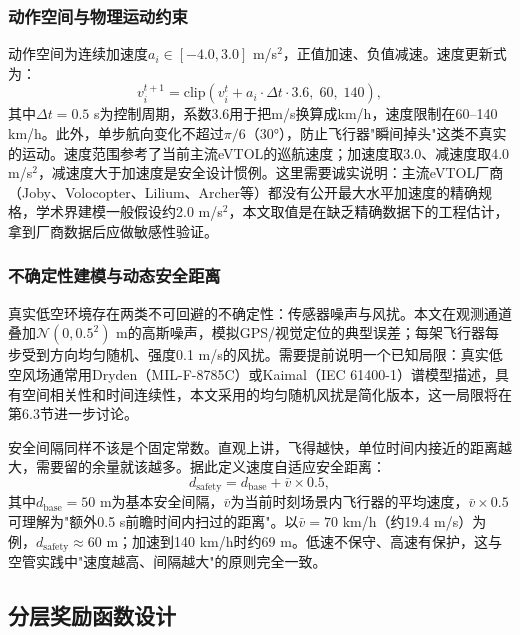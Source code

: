 \documentclass[12pt,a4paper,UTF8]{ctexart}
\begin{document}
\subsubsection{动作空间与物理运动约束}

动作空间为连续加速度$a_i\in[-4.0, 3.0]$ m/s$^2$，正值加速、负值减速。速度更新式为：
\begin{equation}
    v_i^{t+1} = \text{clip}\!\left(v_i^{t} + a_i \cdot \Delta t \cdot 3.6,\; 60,\; 140\right),
    \label{eq:velocity_update}
\end{equation}
其中$\Delta t=0.5$ s为控制周期，系数3.6用于把m/s换算成km/h，速度限制在60--140 km/h。此外，单步航向变化不超过$\pi/6$（30°），防止飞行器"瞬间掉头"这类不真实的运动。速度范围参考了当前主流eVTOL的巡航速度；加速度取3.0、减速度取4.0 m/s$^2$，减速度大于加速度是安全设计惯例。这里需要诚实说明：主流eVTOL厂商（Joby、Volocopter、Lilium、Archer等）都没有公开最大水平加速度的精确规格，学术界建模一般假设约2.0 m/s$^2$\cite{ref25}，本文取值是在缺乏精确数据下的工程估计，拿到厂商数据后应做敏感性验证。

\subsubsection{不确定性建模与动态安全距离}

真实低空环境存在两类不可回避的不确定性：传感器噪声与风扰。本文在观测通道叠加$\mathcal{N}(0, 0.5^2)$ m的高斯噪声，模拟GPS/视觉定位的典型误差；每架飞行器每步受到方向均匀随机、强度0.1 m/s的风扰。需要提前说明一个已知局限：真实低空风场通常用Dryden（MIL-F-8785C）\cite{ref26}或Kaimal（IEC 61400-1）\cite{ref44}谱模型描述，具有空间相关性和时间连续性，本文采用的均匀随机风扰是简化版本，这一局限将在第6.3节进一步讨论。

安全间隔同样不该是个固定常数。直观上讲，飞得越快，单位时间内接近的距离越大，需要留的余量就该越多。据此定义速度自适应安全距离：
\begin{equation}
    d_{\text{safety}} = d_{\text{base}} + \bar{v} \times 0.5,
    \label{eq:safety_distance}
\end{equation}
其中$d_{\text{base}}=50$ m为基本安全间隔，$\bar{v}$为当前时刻场景内飞行器的平均速度，$\bar{v}\times0.5$可理解为"额外0.5 s前瞻时间内扫过的距离"。以$\bar{v}=70$ km/h（约19.4 m/s）为例，$d_{\text{safety}}\approx60$ m；加速到140 km/h时约69 m。低速不保守、高速有保护，这与空管实践中"速度越高、间隔越大"的原则完全一致。

\subsection{分层奖励函数设计}
\end{document}
